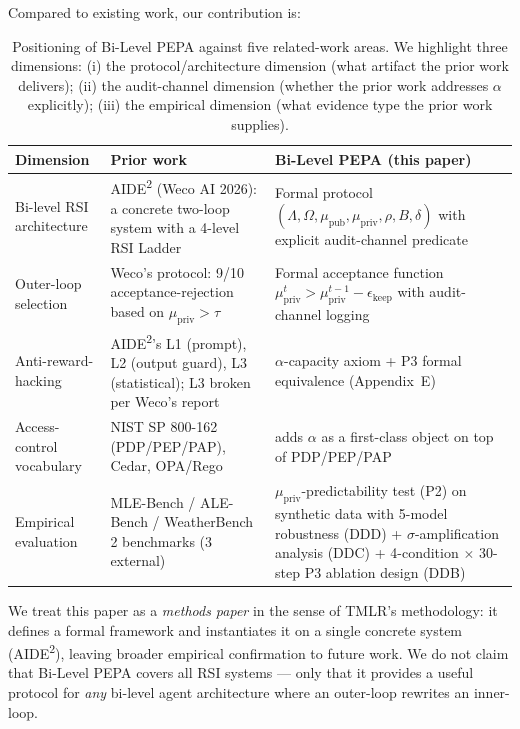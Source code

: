 \documentclass{article}
\theoremstyle{definition}
\begin{document}
Compared to existing work, our contribution is:

\begin{table}[h]
\centering
\caption{Positioning of Bi-Level PEPA against five related-work areas. We highlight three dimensions: (i) the protocol/architecture dimension (what artifact the prior work delivers); (ii) the audit-channel dimension (whether the prior work addresses $\alpha$ explicitly); (iii) the empirical dimension (what evidence type the prior work supplies).}
\label{tab:positioning}
\begin{tabular}{p{} p{} p{}}
\toprule
\textbf{Dimension} & \textbf{Prior work} & \textbf{Bi-Level PEPA (this paper)} \\
\midrule
Bi-level RSI architecture & AIDE\textsuperscript{2} (Weco AI 2026): a concrete two-loop system with a 4-level RSI Ladder & Formal protocol $(\Lambda, \Omega, \mu_{\text{pub}}, \mu_{\text{priv}}, \rho, B, \delta)$ with explicit audit-channel predicate \\
Outer-loop selection & Weco's protocol: 9/10 acceptance-rejection based on $\mu_{\text{priv}} > \tau$ & Formal acceptance function $\mu_{\text{priv}}^t > \mu_{\text{priv}}^{t-1} - \epsilon_{\text{keep}}$ with audit-channel logging \\
Anti-reward-hacking & AIDE\textsuperscript{2}'s L1 (prompt), L2 (output guard), L3 (statistical); L3 broken per Weco's report & $\alpha$-capacity axiom + P3 formal equivalence (Appendix~E) \\
Access-control vocabulary & NIST SP 800-162 (PDP/PEP/PAP), Cedar, OPA/Rego & adds $\alpha$ as a first-class object on top of PDP/PEP/PAP \\
Empirical evaluation & MLE-Bench / ALE-Bench / WeatherBench 2 benchmarks (3 external) & $\mu_{\text{priv}}$-predictability test (P2) on synthetic data with 5-model robustness (DDD) + $\sigma$-amplification analysis (DDC) + 4-condition $\times$ 30-step P3 ablation design (DDB) \\
\bottomrule
\end{tabular}
\end{table}

We treat this paper as a \emph{methods paper} in the sense of TMLR's methodology: it defines a formal framework and instantiates it on a single concrete system (AIDE\textsuperscript{2}), leaving broader empirical confirmation to future work. We do not claim that Bi-Level PEPA covers all RSI systems --- only that it provides a useful protocol for \emph{any} bi-level agent architecture where an outer-loop rewrites an inner-loop.
\end{document}
